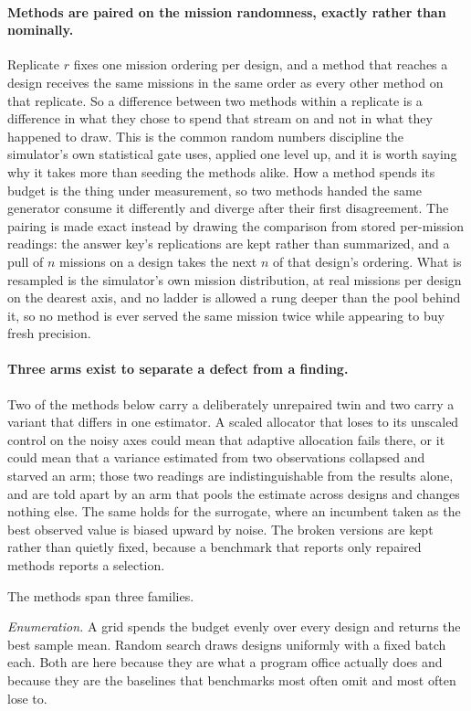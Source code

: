 \documentclass[11pt]{article}
\begin{document}
\paragraph{Methods are paired on the mission randomness, exactly rather than nominally.} Replicate
$r$ fixes one mission ordering per design, and a method that reaches a design receives the same
missions in the same order as every other method on that replicate. So a difference between two
methods within a replicate is a difference in what they chose to spend that stream on and not in
what they happened to draw. This is the common random numbers discipline the simulator's own
statistical gate uses, applied one level up, and it is worth saying why it takes more than seeding
the methods alike. How a method spends its budget is the thing under measurement, so two methods
handed the same generator consume it differently and diverge after their first disagreement. The
pairing is made exact instead by drawing the comparison from stored per-mission readings: the
answer key's replications are kept rather than summarized, and a pull of $n$ missions on a design
takes the next $n$ of that design's ordering. What is resampled is the simulator's own mission
distribution, at \BnRepsLoss{} real missions per design on the dearest axis, and no ladder is
allowed a rung deeper than the pool behind it, so no method is ever served the same mission twice
while appearing to buy fresh precision.

\paragraph{Three arms exist to separate a defect from a finding.} Two of the methods below carry a
deliberately unrepaired twin and two carry a variant that differs in one estimator. A scaled
allocator that loses to its unscaled control on the noisy axes could mean that adaptive allocation
fails there, or it could mean that a variance estimated from two observations collapsed and starved
an arm; those two readings are indistinguishable from the results alone, and are told apart by an
arm that pools the estimate across designs and changes nothing else. The same holds for the
surrogate, where an incumbent taken as the best observed value is biased upward by noise. The
broken versions are kept rather than quietly fixed, because a benchmark that reports only repaired
methods reports a selection.

The methods span three families.

\emph{Enumeration.} A grid spends the budget evenly over every design and returns the best sample
mean. Random search draws designs uniformly with a fixed batch each. Both are here because they are
what a program office actually does and because they are the baselines that benchmarks most often
omit and most often lose to.
\end{document}
